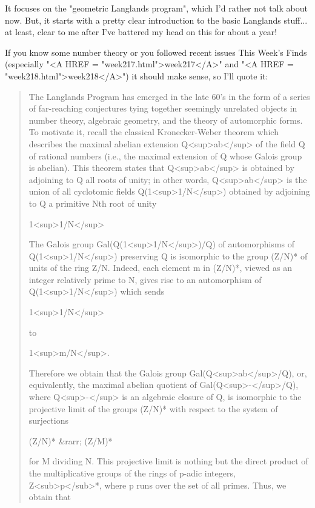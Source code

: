 It focuses on the "geometric Langlands program", which I'd rather 
not talk about now.  But, it starts with a pretty clear introduction 
to the basic Langlands stuff... at least, clear to me after I've 
battered my head on this for about a year!  

If you know some number theory or you followed recent issues
This Week's Finds (especially "<A HREF = "week217.html">week217</A>"
and "<A HREF = "week218.html">week218</A>") it should 
make sense, so I'll quote it:

\begin{quote}
  The Langlands Program has emerged in the late 60's in the form of 
  a series of far-reaching conjectures tying together seemingly 
  unrelated objects in number theory, algebraic geometry, and the 
  theory of automorphic forms.  To motivate it, recall the classical 
  Kronecker-Weber theorem which describes the maximal abelian extension 
  Q<sup>ab</sup> of the field Q of rational numbers (i.e., the maximal extension 
  of Q whose Galois group is abelian).  This theorem states that Q<sup>ab</sup>
  is obtained by adjoining to Q all roots of unity; in other words, 
  Q<sup>ab</sup> is the union of all cyclotomic fields Q(1<sup>1/N</sup>) 
  obtained by adjoining to Q a primitive Nth root of unity 

  1<sup>1/N</sup>

  The Galois group Gal(Q(1<sup>1/N</sup>)/Q) of automorphisms of 
  Q(1<sup>1/N</sup>) 
  preserving Q is isomorphic to the group (Z/N)* of units of the 
  ring Z/N.  Indeed, each element m in (Z/N)*, viewed as an integer 
  relatively prime to N, gives rise to an automorphism of Q(1<sup>1/N</sup>) 
  which sends

  1<sup>1/N</sup>

  to 

  1<sup>m/N</sup>.

  Therefore we obtain that the Galois group Gal(Q<sup>ab</sup>/Q), or, 
  equivalently, the maximal abelian quotient of Gal(Q<sup>-</sup>/Q), 
  where Q<sup>-</sup> is an algebraic closure of Q, is isomorphic to the 
  projective limit of the groups (Z/N)* with respect to the system 
  of surjections

  (Z/N)* &rarr; (Z/M)* 

  for M dividing N. This projective limit is nothing but the direct 
  product of the multiplicative groups of the rings of p-adic 
  integers, Z<sub>p</sub>*, where p runs over the set of all primes.  Thus, 
  we obtain that


\end{quote}

